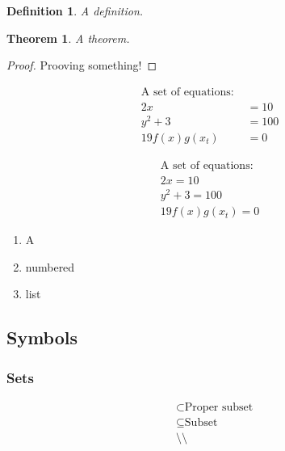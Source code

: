 \documentclass{article}
\newtheorem{definition}{Definition}
\newtheorem{theorem}{Theorem}
\begin{document}
\begin{definition}
    A definition.
\end{definition}

\begin{theorem}
    A theorem.
\end{theorem}

\begin{proof}
    Prooving something!
\end{proof}

\begin{align*}
    \text{A set of equations: } & \\
    2x &= 10 \\
    y^2 + 3 &= 100 \\
    19 f(x)g(x_t) &= 0
\end{align*}

\begin{gather*}
    \text{A set of equations: } \\
    2x = 10 \\
    y^2 + 3 = 100 \\
    19 f(x)g(x_t) = 0
\end{gather*}

\begin{enumerate}
    \item A
    \item numbered
    \item list
\end{enumerate}

\subsection{Symbols}

\subsubsection{Sets}

\begin{align*}
    & \subset \text{Proper subset} \\
    & \subseteq \text{Subset} \\
    & \setminus \text{\textbackslash} \\
\end{align*}

 


\end{document}

